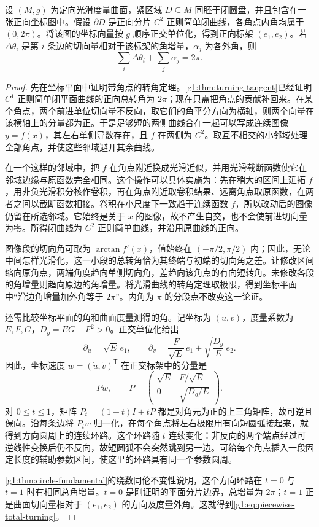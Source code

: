 \begin{lemma}
	\label{g1:lem:piecewise-turning}
	设 \((M,g)\) 为定向光滑度量曲面，紧区域 \(D\subseteq M\) 同胚于闭圆盘，并且包含在一张正向坐标图中。假设 \(\partial D\) 是正向分片 \(C^2\) 正则简单闭曲线，各角点内角均属于 \((0,2\pi)\)。将该图的坐标向量按 \(g\) 顺序正交单位化，得到正向标架 \((e_1,e_2)\)。若 \(\Delta\theta_i\) 是第 \(i\) 条边的切向量相对于该标架的角增量，\(\alpha_j\) 为各外角，则
	\begin{equation}
		\label{g1:eq:piecewise-total-turning}
		\sum_i\Delta\theta_i+\sum_j\alpha_j=2\pi.
	\end{equation}
\end{lemma}
\begin{proof}
	先在坐标平面中证明带角点的转角定理。\cref{g1:thm:turning-tangent}已经证明 \(C^1\) 正则简单闭平面曲线的正向总转角为 \(2\pi\)；现在只需把角点的贡献补回来。在某个角点，两个前进单位切向量不反向，取它们的角平分方向为横轴，则两个向量在该横轴上的分量都为正。于是足够短的两侧曲线合在一起可以写成连续图像 \(y=f(x)\)，其左右单侧导数存在，且 \(f\) 在两侧为 \(C^2\)。取互不相交的小邻域处理全部角点，并使这些邻域避开其余曲线。

	在一个这样的邻域中，把 \(f\) 在角点附近换成光滑近似，并用光滑截断函数使它在邻域边缘与原函数完全相同。这个操作可以具体实施为：先在稍大的区间上延拓 \(f\)，用非负光滑积分核作卷积，再在角点附近取卷积结果、远离角点取原函数，在两者之间以截断函数相接。卷积在小尺度下一致趋于连续函数 \(f\)，所以改动后的图像仍留在所选邻域。它始终是关于 \(x\) 的图像，故不产生自交，也不会使前进切向量为零。所得闭曲线为 \(C^2\) 正则简单曲线，并沿用原曲线的正向。

	图像段的切向角可取为 \(\arctan f'(x)\)，值始终在 \((-\pi/2,\pi/2)\) 内；因此，无论中间怎样光滑化，这一小段的总转角恰为其终端与初端的切向角之差。让修改区间缩向原角点，两端角度趋向单侧切向角，差趋向该角点的有向短转角。未修改各段的角增量则趋向原边的角增量。将光滑曲线的转角定理取极限，得到坐标平面中“沿边角增量加外角等于 \(2\pi\)”。内角为 \(\pi\) 的分段点不改变这一论证。

	还需比较坐标平面的角和曲面度量测得的角。记坐标为 \((u,v)\)，度量系数为 \(E,F,G\)，\(D_g=EG-F^2>0\)。正交单位化给出
	\[
		\partial_u=\sqrt E\,e_1,\qquad
		\partial_v=\frac{F}{\sqrt E}\,e_1+\sqrt{\frac{D_g}{E}}\,e_2.
	\]
	因此，坐标速度 \(w=(\dot u,\dot v)^{\mathsf T}\) 在正交标架中的分量是
	\[
		Pw,\qquad
		P=\begin{pmatrix}\sqrt E&F/\sqrt E\\0&\sqrt{D_g/E}\end{pmatrix}.
	\]
	对 \(0\leq t\leq1\)，矩阵 \(P_t=(1-t)I+tP\) 都是对角元为正的上三角矩阵，故可逆且保向。沿每条边将 \(P_tw\) 归一化，在每个角点将左右极限用有向短圆弧接起来，就得到方向圆周上的连续环路。这个环路随 \(t\) 连续变化：非反向的两个端点经过可逆线性变换后仍不反向，故短圆弧不会突然跳到另一边。可给每个角点插入一段固定长度的辅助参数区间，使这里的环路具有同一个参数圆周。

	\cref{g1:thm:circle-fundamental}的绕数同伦不变性说明，这个方向环路在 \(t=0\) 与 \(t=1\) 时有相同总角增量。\(t=0\) 是刚证明的平面分片边界，总增量为 \(2\pi\)；\(t=1\) 正是曲面切向量相对于 \((e_1,e_2)\) 的方向及度量外角。这就得到\eqref{g1:eq:piecewise-total-turning}。
\end{proof}

